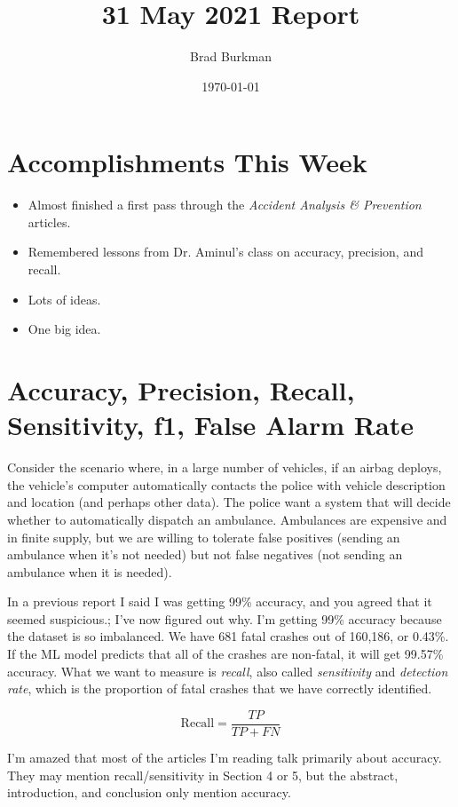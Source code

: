 \documentclass[11pt]{article}
\title{31 May 2021 Report}
\author{Brad Burkman}
\date{\today}
\begin{document}
\setlength{\parindent}{20pt}
\begin{spacing}{1.2}
\maketitle
\tableofcontents


\section{Accomplishments This Week}

\begin{itemize}
	\item Almost finished a first pass through the {\it Accident Analysis \& Prevention} articles.  
	\item Remembered lessons from Dr. Aminul's class on accuracy, precision, and recall.
	\item Lots of ideas.
	\item One big idea.  
\end{itemize}

\section{Accuracy, Precision, Recall, Sensitivity, f1, False Alarm Rate}

Consider the scenario where, in a large number of vehicles, if an airbag deploys, the vehicle's computer automatically contacts the police with vehicle description and location (and perhaps other data).  The police want a system that will decide whether to automatically dispatch an ambulance.   Ambulances are expensive and in finite supply, but we are willing to tolerate false positives (sending an ambulance when it's not needed) but not false negatives (not sending an ambulance when it is needed). 

In a previous report I said I was getting 99\% accuracy, and you agreed that it seemed suspicious.; I've now figured out why.  I'm getting 99\% accuracy because the dataset is so imbalanced.  We have 681 fatal crashes out of 160,186, or 0.43\%.  If the ML model predicts that all of the crashes are non-fatal, it will get 99.57\% accuracy.  What we want to measure is {\it recall}, also called {\it sensitivity} and {\it detection rate}, which is the proportion of fatal crashes that we have correctly identified.  

$$\text{Recall} = \frac{TP}{TP + FN}$$

I'm amazed that most of the articles I'm reading talk primarily about accuracy.  They may mention recall/sensitivity in Section 4 or 5, but the abstract, introduction, and conclusion only mention accuracy.  


\end{spacing}
\end{document}
